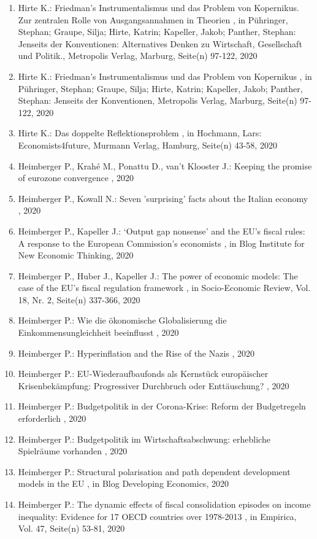 \begin{enumerate}[leftmargin=*, labelsep=0.5cm]
	 \item Hirte K.:  Friedman’s Instrumentalismus und das Problem von Kopernikus. Zur zentralen Rolle von Ausgangsannahmen in Theorien  , in Pühringer, Stephan; Graupe, Silja; Hirte, Katrin; Kapeller, Jakob; Panther, Stephan: Jenseits der Konventionen: Alternatives Denken zu Wirtschaft, Gesellschaft und Politik., Metropolis Verlag, Marburg, Seite(n) 97-122, 2020
	 \item Hirte K.:  Friedman’s Instrumentalismus und das Problem von Kopernikus  , in Pühringer, Stephan; Graupe, Silja; Hirte, Katrin; Kapeller, Jakob; Panther, Stephan: Jenseits der Konventionen, Metropolis Verlag, Marburg, Seite(n) 97-122, 2020
	 \item Hirte K.:  Das doppelte Reflektionsproblem  , in Hochmann, Lars: Economists4future, Murmann Verlag, Hamburg, Seite(n) 43-58, 2020
	 \item Heimberger P., Krahé M., Ponattu D., van't Klooster J.:  Keeping the promise of eurozone convergence  , 2020
	 \item Heimberger P., Kowall N.:  Seven ’surprising’ facts about the Italian economy  , 2020
	 \item Heimberger P., Kapeller J.:  ‘Output gap nonsense’ and the EU’s fiscal rules: A response to the European Commission’s economists  , in Blog Institute for New Economic Thinking, 2020
	 \item Heimberger P., Huber J., Kapeller J.:  The power of economic models: The case of the EU's fiscal regulation framework  , in Socio-Economic Review, Vol. 18, Nr. 2, Seite(n) 337-366, 2020
	 \item Heimberger P.:  Wie die ökonomische Globalisierung die Einkommensungleichheit beeinflusst  , 2020
	 \item Heimberger P.:  Hyperinflation and the Rise of the Nazis  , 2020
	 \item Heimberger P.:  EU-Wiederaufbaufonds als Kernstück europäischer Krisenbekämpfung: Progressiver Durchbruch oder Enttäuschung?  , 2020
	 \item Heimberger P.:  Budgetpolitik in der Corona-Krise: Reform der Budgetregeln erforderlich  , 2020
	 \item Heimberger P.:  Budgetpolitik im Wirtschaftsabschwung: erhebliche Spielräume vorhanden  , 2020
	 \item Heimberger P.:  Structural polarisation and path dependent development models in the EU  , in Blog Developing Economics, 2020
	 \item Heimberger P.:  The dynamic effects of fiscal consolidation episodes on income inequality: Evidence for 17 OECD countries over 1978-2013  , in Empirica, Vol. 47, Seite(n) 53-81, 2020

\end{enumerate}
